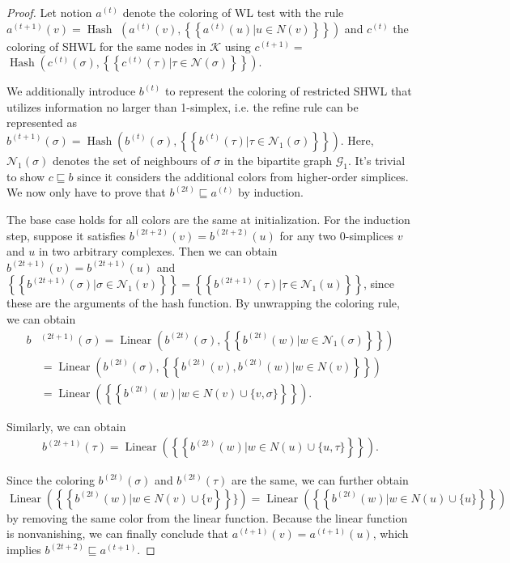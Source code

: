 \documentclass[letterpaper]{article} \usepackage{aaai24}
\newcommand \multiset[1] {\left\{\!\!\left\{#1\right\}\!\!\right\} }
\theoremstyle{plain}
\theoremstyle{definition}
\theoremstyle{remark}
\begin{document}
\begin{proof} 
\label{proof:SHWL}
Let notion $a^{(t)}$ denote the coloring of WL test with the rule  $ a^{(t+1)}(v)=\operatorname{Hash}$ $ \left(a^{(t)}(v), \multiset{a^{(t)}(u) | u \in N(v)} \right)$ and $c^{(t)}$ the coloring of SHWL for the same nodes in $\mathcal{K}$ using $c^{(t+1)} =$ $ \operatorname{Hash}\left( c^{(t)}(\sigma), \multiset{c^{(t)}(\tau) | \tau \in \mathcal{N}(\sigma)} \right)$.

We additionally introduce $b^{(t)}$ to represent the coloring of restricted SHWL that utilizes information no larger than 1-simplex, i.e. the refine rule can be represented as $b^{(t+1)}(\sigma) = \operatorname{Hash}\left( b^{(t)}(\sigma), \multiset{b^{(t)}(\tau) | \tau \in \mathcal{N}_1(\sigma)} \right)$. Here, $\mathcal{N}_1(\sigma)$ denotes the set of neighbours of $\sigma$ in the bipartite graph $\mathcal{G}_1$.  It's trivial to show $c \sqsubseteq b$ since it considers the additional colors from higher-order simplices. We now only have to prove that $b^{(2t)} \sqsubseteq a^{(t)}$ by induction.

The base case holds for all colors are the same at initialization.
 For the induction step, suppose it satisfies $b^{(2t+2)}(v) = b^{(2t+2)}(u)$ for any two 0-simplices $v$ and $u$ in two arbitrary complexes. Then we can obtain $b^{(2t+1)}(v)=b^{(2t+1)}(u)$ and $\multiset{b^{(2t+1)}(\sigma)|\sigma \in \mathcal{N}_1(v) } = \multiset{b^{(2t+1)}(\tau)|\tau \in \mathcal{N}_1(u) }$, since these are the arguments of the hash function.  By unwrapping the coloring rule, we can obtain
 \begin{equation}
    \begin{split}
       b&^{(2t+1)}(\sigma) 
      = \operatorname{Linear}\left(b^{(2t)}(\sigma), \multiset{b^{(2t)}(w)|w \in \mathcal{N}_1(\sigma)} \right)\\
     & =\operatorname{Linear}\left(b^{(2t)}(\sigma), \multiset{b^{(2t)}(v), b^{(2t)}(w)|w \in N(v)}\right) \\
     & = \operatorname{Linear}\left( \multiset{b^{(2t)}(w)|w \in N(v)\cup \{v, \sigma\} }\right).
    \end{split}
\end{equation}

Similarly, we can obtain 
\begin{align}
    b^{(2t+1)}(\tau) = \operatorname{Linear}\left( \multiset{b^{(2t)}(w)|w \in N(u)\cup \{u, \tau\} }\right).
\end{align}

Since the coloring $b^{(2t)}(\sigma)$ and $b^{(2t)}(\tau)$ are the same, we can further obtain  $\operatorname{Linear}\left( \multiset{b^{(2t)}(w)|w \in N(v)\cup \{v} \}\right)=\operatorname{Linear}\left( \multiset{b^{(2t)}(w)|w \in N(u)\cup \{u\} }\right)$ by removing the same color from the linear function. Because the linear function is nonvanishing, we can finally conclude that $a^{(t+1)}(v)=a^{(t+1)}(u)$, which implies $b^{(2t+2)} \sqsubseteq a^{(t+1)}$.
\end{proof}
\end{document}

